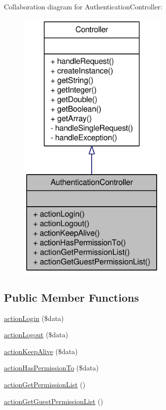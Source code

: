 Collaboration diagram for AuthenticationController:\nopagebreak
\begin{figure}[H]
\begin{center}
\leavevmode
\includegraphics[width=208pt]{classAuthenticationController__coll__graph}
\end{center}
\end{figure}
\subsection*{Public Member Functions}
\begin{DoxyCompactItemize}
\item 
\hyperlink{classAuthenticationController_a508a7e66f7024926a2a9d3d24adb3eba}{actionLogin} (\$data)
\item 
\hyperlink{classAuthenticationController_acdc76a1b78a881df16ae6beac5ca6ae3}{actionLogout} (\$data)
\item 
\hyperlink{classAuthenticationController_a68500ed26f6a8178e3e255f380ec8455}{actionKeepAlive} (\$data)
\item 
\hyperlink{classAuthenticationController_a157fcb263bbb409a114ac940c2abfed0}{actionHasPermissionTo} (\$data)
\item 
\hyperlink{classAuthenticationController_ac45eccdb761b3718d8d4789582b6aea6}{actionGetPermissionList} ()
\item 
\hyperlink{classAuthenticationController_a3c194770ce772109bdd389a2ca284ccb}{actionGetGuestPermissionList} ()
\end{DoxyCompactItemize}


